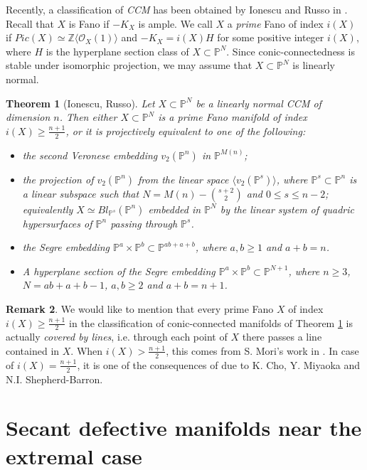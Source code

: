 \documentclass[11pt]{amsart}
\def\P{{\mathbb P}}
\def\Z{{\mathbb Z}}
\theoremstyle{theorem} %
\newtheorem{Thm}{Theorem}[section]
\theoremstyle{definition}
\newtheorem{Remk}[Thm]{Remark}
\numberwithin{equation}{section}
\begin{document}
Recently, a classification of \textit{CCM} has been obtained by Ionescu and Russo in \cite{IR1}. Recall that $X$ is Fano if $-K_X$ is ample. We call $X$ a {\it prime} Fano of index $i(X)$ if $Pic(X)\simeq\Z\langle\mathcal O_X(1)\rangle$ and $-K_X=i(X)H$ for some positive integer $i(X)$, where $H$ is the hyperplane section class of $X\subset \P^{N}$. Since conic-connectedness is stable under isomorphic projection, we may assume that $X\subset \P^{N}$ is linearly normal.

\begin{Thm}[Ionescu, Russo]\label{CC} Let $X\subset\P^N$ be a linearly normal CCM of dimension $n$. Then either $X\subset \P^{N}$ is a prime Fano manifold of index $i(X)\ge \frac{n+1}{2}$, or it is projectively equivalent to one of the following:
\begin{itemize}
\item[(a)] the second Veronese embedding $v_2(\P^n)$ in $\P^{M(n)}$;
\item[(b)] the projection of $v_2(\P^n)$ from the linear space $\langle v_2(\P^s)\rangle$, where $\P^s\subset \P^n$ is a linear subspace such that $N=M(n)-{s+2 \choose 2}$ and $0\le s \le n-2$; equivalently $X\simeq Bl_{\P^s}(\P^n)$ embedded in $\P^N$ by the linear system of quadric hypersurfaces of $\P^n$ passing through $\P^s$.
\item[(c)] the Segre embedding $\P^a\times\P^b\subset\P^{ab+a+b}$, where  $a,b\ge1$ and $a+b=n$.
\item[(d)] A hyperplane section of the Segre embedding $\P^a\times\P^b\subset\P^{N+1}$, where $n\ge3$, $N=ab+a+b-1$, $a,b\ge2$ and $a+b=n+1$.
\end{itemize}
\end{Thm}

\begin{Remk}\label{cov_line}
We would like to mention that every prime Fano $X$ of index $i(X)\ge\frac{n+1}{2}$ in the classification of conic-connected manifolds of Theorem \ref{CC} is actually \textit{covered by lines}, i.e. through each point of $X$ there passes a line contained in $X$. When $i(X)>\frac{n+1}{2}$, this comes from S. Mori's work in \cite{Mo}. In case of $i(X)=\frac{n+1}{2}$, it is one of the consequences of \cite{CMSB} due to K. Cho, Y. Miyaoka and N.I. Shepherd-Barron.
\end{Remk}


\section{Secant defective manifolds near the extremal case}\label{section_2}
\end{document}
